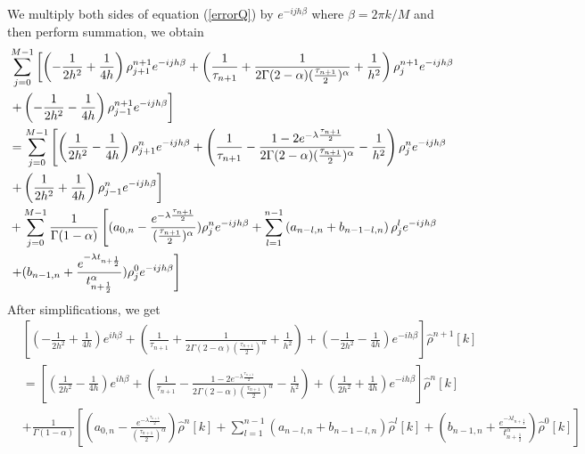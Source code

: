 \documentclass[10pt, reqno]{amsart}
\theoremstyle{remark}
\theoremstyle{definition}
\numberwithin{table}{section}
\begin{document}
We multiply both sides of equation (\ref{errorQ}) by $e^{-ijh\beta}$  where $\beta = 2\pi k/M$ and then perform summation, we obtain
\begin{equation}\notag
\begin{aligned}
&\sum_{j=0}^{M-1}\left[\left(-\frac{1}{2 h^2}+\frac{1}{4h}\right) \rho_{j+1}^{n+1}e^{-ijh\beta}+\left(\frac{1}{\tau_{n+1}}+\frac{1}{2\Gamma(2-\alpha)(\frac{\tau_{n+1}}{2})^\alpha}+\frac{1}{h^2}\right) \rho_{j}^{n+1}e^{-ijh\beta}\right. \\
&\left. +\left(-\frac{1}{2 h^2}-\frac{1}{4h}\right) \rho_{j-1}^{n+1}e^{-ijh\beta}\right] \\
&=\sum_{j=0}^{M-1}\left[\left(\frac{1}{2 h^2}-\frac{1}{4h}\right) \rho_{j+1}^{n}e^{-ijh\beta}+\left(\frac{1}{\tau_{n+1}}-\frac{1-2e^{-\lambda \frac{\tau_{n+1}}{2}}}{2\Gamma(2-\alpha)(\frac{\tau_{n+1}}{2})^\alpha}-\frac{1}{h^2}\right) \rho_{j}^{n}e^{-ijh\beta}\right. \\
&\left. +\left(\frac{1}{2 h^2}+\frac{1}{4h}\right) \rho_{j-1}^{n}e^{-ijh\beta}\right] \\
&+\sum_{j=0}^{M-1}\frac{1}{\Gamma(1-\alpha)}\left[(a_{0, n}-\frac{e^{-\lambda \frac{\tau_{n+1}}{2}}}{(\frac{\tau_{n+1}}{2})^\alpha}) \rho_{j}^{n}e^{-ijh\beta}+\sum\limits_{l=1}^{n-1} \left(a_{n-l, n}+b_{n-1-l, n}\right) \rho_{j}^{l}e^{-ijh\beta}\right. \\
&\left. +(b_{n-1, n}+\frac{e^{-\lambda t_{n+\frac{1}{2}}}}{t_{n+\frac{1}{2}}^\alpha}) \rho_{j}^{0}e^{-ijh\beta}\right] 
\end{aligned}
\end{equation}
After simplifications, we get
\begin{equation}\label{simple}
\begin{aligned}
&\left[\left(-\frac{1}{2 h^2}+\frac{1}{4h}\right) e^{ih\beta}+\left(\frac{1}{\tau_{n+1}}+\frac{1}{2\Gamma(2-\alpha)(\frac{\tau_{n+1}}{2})^\alpha}+\frac{1}{h^2}\right)+\left(-\frac{1}{2 h^2}-\frac{1}{4h}\right) e^{-ih\beta}\right]\hat{\rho}^{n+1}[k] \\
&=\left[\left(\frac{1}{2 h^2}-\frac{1}{4h}\right) e^{ih\beta}+\left(\frac{1}{\tau_{n+1}}-\frac{1-2e^{-\lambda \frac{\tau_{n+1}}{2}}}{2\Gamma(2-\alpha)(\frac{\tau_{n+1}}{2})^\alpha}-\frac{1}{h^2}\right)+\left(\frac{1}{2 h^2}+\frac{1}{4h}\right) e^{-ih\beta}\right]\hat{\rho}^{n}[k] \\
&+\frac{1}{\Gamma(1-\alpha)}\left[(a_{0, n}-\frac{e^{-\lambda \frac{\tau_{n+1}}{2}}}{(\frac{\tau_{n+1}}{2})^\alpha}) \hat{\rho}^{n}[k]+\sum\limits_{l=1}^{n-1} \left(a_{n-l, n}+b_{n-1-l, n}\right) \hat{\rho}^{l}[k]+(b_{n-1, n}+\frac{e^{-\lambda t_{n+\frac{1}{2}}}}{t_{n+\frac{1}{2}}^\alpha}) \hat{\rho}^{0}[k]\right] 
\end{aligned}
\end{equation}
\end{document}
